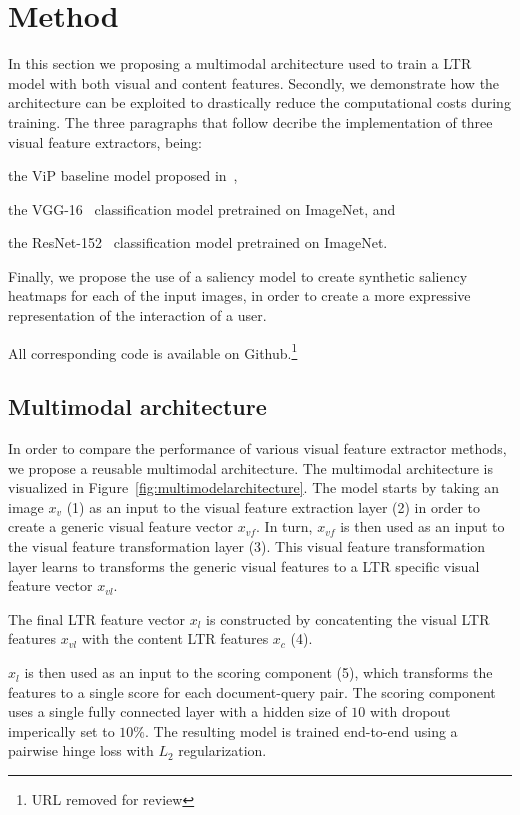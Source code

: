 
\section{Method}
In this section we proposing a multimodal architecture used to train a \ac{LTR} model with both visual and content features. 
Secondly, we demonstrate how the architecture can be exploited to drastically reduce the computational costs during training. 
The three paragraphs that follow decribe the implementation of three visual feature extractors, being:
\begin{inparaenum}[(i)]
\item the ViP baseline model proposed in~\citet{fan2017learning}, 
\item the VGG-16~\cite{simonyan2014very} classification model pretrained on ImageNet, and
\item the ResNet-152~\cite{he2016deep} classification model pretrained on ImageNet.
\end{inparaenum} 
Finally, we propose the use of a saliency model to create synthetic saliency heatmaps for each of the input images, in order to create a more expressive representation of the interaction of a user. 

All corresponding code is available on Github.\footnote{URL removed for review}

\subsection{Multimodal architecture}
In order to compare the performance of various visual feature extractor methods, we propose a reusable multimodal architecture. 
The multimodal architecture is visualized in Figure~\ref{fig:multimodelarchitecture}. 
The model starts by taking an image $x_{v}$ (1) as an input to the visual feature extraction layer (2) in order to create a generic visual feature vector $x_{vf}$. In turn, $x_{vf}$ is then used as an input to the visual feature transformation layer (3).
This visual feature transformation layer learns to transforms the generic visual features to a \ac{LTR} specific visual feature vector $x_{vl}$.

The final \ac{LTR} feature vector $x_{l}$ is constructed by concatenting the visual \ac{LTR} features $x_{vl}$ with the content \ac{LTR} features $x_{c}$ (4). 

$x_{l}$ is then used as an input to the scoring component (5), which transforms the features to a single score for each document-query pair. The scoring component uses a single fully connected layer with a hidden size of $10$ with dropout imperically set to $10\%$. The resulting model is trained end-to-end using a pairwise hinge loss with $L_2$ regularization. 

